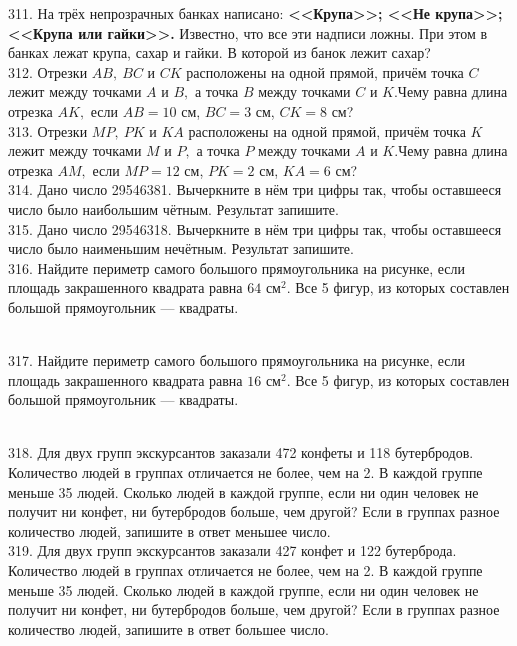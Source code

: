 311. На трёх непрозрачных банках написано: {\bf <<Крупа>>; <<Не крупа>>; <<Крупа или гайки>>.} Известно, что все эти надписи ложны. При этом в банках лежат крупа, сахар и гайки. В которой из банок лежит сахар?\\
312. Отрезки $AB,\ BC$ и $CK$ расположены на одной прямой, причём точка $C$ лежит между точками $A$ и $B,$ а точка $B$ между точками $C$ и $K.$Чему равна длина отрезка $AK,$ если $AB=10$ см, $BC=3$ см, $CK=8$ см?\\
313. Отрезки $MP,\ PK$ и $KA$ расположены на одной прямой, причём точка $K$ лежит между точками $M$ и $P,$ а точка $P$ между точками $A$ и $K.$Чему равна длина отрезка $AM,$ если $MP=12$ см, $PK=2$ см, $KA=6$ см?\\
314. Дано число 29546381. Вычеркните в нём три цифры так, чтобы оставшееся число было наибольшим чётным. Результат запишите.\\
315. Дано число 29546318. Вычеркните в нём три цифры так, чтобы оставшееся число было наименьшим нечётным. Результат запишите.\\
316. Найдите периметр самого большого прямоугольника на рисунке, если площадь закрашенного квадрата равна $64\text{ см}^2.$ Все 5 фигур, из которых составлен большой прямоугольник --- квадраты.\\
\begin{figure}[ht!]
\end{figure}\\
317. Найдите периметр самого большого прямоугольника на рисунке, если площадь закрашенного квадрата равна $16\text{ см}^2.$ Все 5 фигур, из которых составлен большой прямоугольник --- квадраты.\\
\begin{figure}[ht!]
\end{figure}\\
318. Для двух групп экскурсантов заказали 472 конфеты и 118 бутербродов. Количество людей в группах отличается не более, чем на 2. В каждой группе меньше 35 людей. Сколько людей в каждой группе, если ни один человек не получит ни конфет, ни бутербродов больше, чем другой? Если в группах разное количество людей, запишите в ответ меньшее число.\\
319. Для двух групп экскурсантов заказали 427 конфет и 122 бутерброда. Количество людей в группах отличается не более, чем на 2. В каждой группе меньше 35 людей. Сколько людей в каждой группе, если ни один человек не получит ни конфет, ни бутербродов больше, чем другой? Если в группах разное количество людей, запишите в ответ большее число.\\
